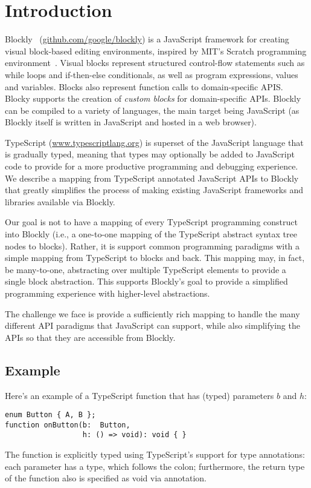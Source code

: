 \section{Introduction}

Blockly~\cite{Blocky2015} (\url{github.com/google/blockly}) 
is a JavaScript framework for creating visual block-based editing environments, 
inspired by MIT’s Scratch programming environment~\cite{ScratchCACM2009}.  Visual blocks represent structured 
control-flow statements such as while loops and if-then-else conditionals, as well as program expressions,
values and variables. 
Blocks also represent function calls to domain-specific APIS. Blocky supports the creation of \emph{custom 
blocks} for domain-specific APIs. Blockly can be compiled to a variety of languages, the main target 
being JavaScript (as Blockly itself is written in JavaScript and hosted in a web browser).

TypeScript (\url{www.typescriptlang.org}) is superset of the JavaScript language that is gradually typed, 
meaning that types may 
optionally be added to JavaScript code to provide for a more productive programming and debugging experience. 
We describe a mapping from TypeScript annotated JavaScript APIs to Blockly that greatly simplifies 
the process of making existing JavaScript frameworks and libraries available via Blockly.

Our goal is not to have a mapping of every TypeScript programming construct into Blockly 
(i.e., a one-to-one mapping of the TypeScript abstract syntax tree nodes to blocks).
Rather, it is support common programming paradigms with a simple mapping
from TypeScript to blocks and back.  This mapping may, in fact, be many-to-one, 
abstracting over multiple TypeScript elements to provide a single block abstraction.
This supports Blockly's goal to provide a simplified programming experience 
with higher-level abstractions. 

The challenge we face is provide a sufficiently rich mapping to handle the
many different API paradigms that JavaScript can support, while
also simplifying the APIs so that they are accessible from Blockly. 

\subsection{Example}

Here's an example of a TypeScript function that has (typed) parameters $b$ and $h$:
\begin{lstlisting}
enum Button { A, B };
function onButton(b:  Button, 
                  h: () => void): void { }
\end{lstlisting}
The function is explicitly typed using TypeScript's support for
type annotations: each parameter has a type, which follows the colon;
furthermore, the return type of the function also is specified as void
via annotation. 

